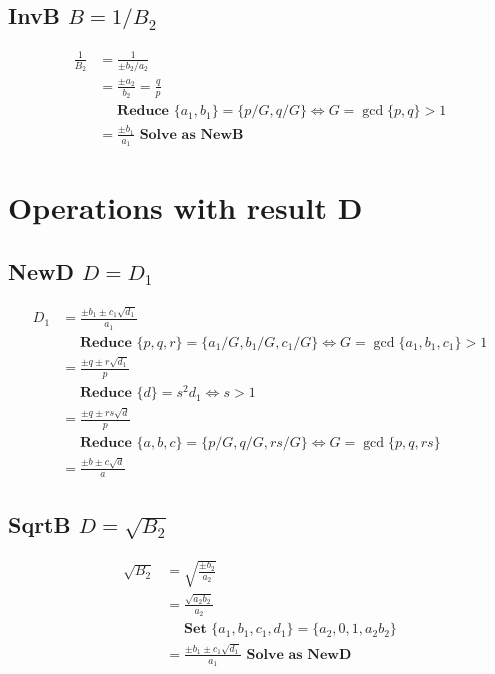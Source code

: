 \documentclass{article}
\begin{document}
\subsection{InvB $B = 1 / B_2$}
\begin{align}
\frac{1}{B_2} &= \frac{1}{\pm b_2 / a_2}\\
 &= \frac{\pm a_2}{b_2} = \frac{q}{p} \\
 &\quad \textbf{ Reduce } \{ a_1,b_1 \} = \{p/G, q/G\} \iff G = \gcd \{ p,q \} > 1 \nonumber \\
 &= \frac{\pm b_1 }{ a_1 } \textbf{ Solve as NewB }
\end{align}

\section{Operations with result D}

\subsection{NewD $D = D_1$}
\begin{align}
D_1 &= \frac{\pm b_1 \pm c_1\sqrt{d_1}}{a_1}\\
 &\quad \textbf{ Reduce } \{p,q,r\} = \{a_1/G,b_1/G,c_1/G\} \iff G = \gcd \{a_1,b_1,c_1\} > 1 \nonumber \\
 &= \frac{\pm q \pm r\sqrt{d_1}}{p} \\
 &\quad \textbf{ Reduce } \{ d \} = s^2d_1 \iff s>1 \nonumber \\
 &= \frac{\pm q \pm rs\sqrt{d}}{p}\\
 &\quad \textbf{ Reduce } \{a,b,c\} = \{p/G,q/G,rs/G\} \iff G = \gcd \{p,q,rs\} \nonumber \\
 &= \frac{\pm b \pm c\sqrt{d}}{a}
\end{align}

\subsection{SqrtB $D = \sqrt{B_2}$}
\begin{align}
\sqrt{B_2} &= \sqrt{\frac{\pm b_2}{a_2}}\\
 &= \frac{\sqrt{a_2b_2}}{a_2}\\
 &\quad \textbf{ Set } \{ a_1, b_1, c_1, d_1\} = \{ a_2, 0, 1, a_2b_2\} \nonumber \\
 &= \frac{\pm b_1 \pm c_1\sqrt{d_1}}{a_1} \textbf{ Solve as NewD }
\end{align}
\end{document}
